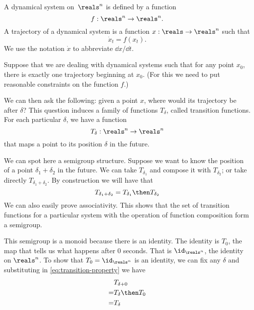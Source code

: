 \begin{example}
\label{exa:transition-functions}
  \begin{definition}
    A dynamical system on~$\reals^n$ is defined by a function
    \begin{equation}
      f: \reals^n \to \reals^n.
    \end{equation}
    A trajectory of a dynamical system is a function $x: \reals \to \reals^n$ such that
    \begin{equation}
      \dot{x}_t = f(x_t).
    \end{equation}
    We use the notation $\dot{x}$ to abbreviate $\dd x / \dd t$.
  \end{definition}

  Suppose that we are dealing with dynamical systems such that for any point $x_0$, there
  is exactly one trajectory beginning at $x_0$. (For this we need to put reasonable constraints
  on the function $f$.)

  We can then ask the following: given a point $x$, where would its trajectory be after $\delta$?
  This question induces a family of functions $T_\delta$, called transition functions.
  For each particular $\delta$, we have a function
  \begin{equation}
    T_{\delta}: \reals^n \to  \reals^n
  \end{equation}
  that maps a point to its position $\delta$ in the future.

  We can spot here a semigroup structure. Suppose we want to know the position of a point $\delta_1 + \delta_2$
  in the future. We can take $T_{\delta_1}$ and compose it with $T_{\delta_2}$; or take directly $T_{\delta_1 + \delta_2}$.
  By construction we will have that
  \begin{equation}
    \label{eq:transition-property}
    T_{\delta_1 + \delta_2} = T_{\delta_1} \then T_{\delta_2}
  \end{equation}
  We can also easily prove associativity.
%
  This shows that the set of transition functions for a particular system with the operation of function composition form a semigroup.

  This semigroup is a monoid because there is an identity. The identity is $T_0$, the map that tells us
  what happens after $0$ seconds. That is $\id_{\reals^n}$, the identity on $\reals^n$.
  To show that $T_0 = \id_{\reals^n}$ is an identity, we can fix any $\delta$ and substituting in \cref{eq:transition-property} we have
  \begin{equation}
    \begin{aligned}
      & T_{\delta + 0} \\
      = & T_{\delta} \then T_{0} \\
      = & T_{\delta}
    \end{aligned}
  \end{equation}

\end{example}


